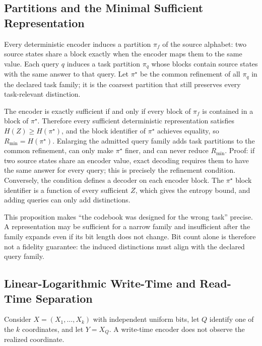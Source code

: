 \subsection{Partitions and the Minimal Sufficient Representation}

Every deterministic encoder induces a partition $\pi_f$ of the source alphabet: two source states share a block exactly when the encoder maps them to the same value. Each query $q$ induces a task partition $\pi_q$ whose blocks contain source states with the same answer to that query. Let $\pi^\star$ be the common refinement of all $\pi_q$ in the declared task family; it is the coarsest partition that still preserves every task-relevant distinction.

\begin{proposition}
The encoder is exactly sufficient if and only if every block of $\pi_f$ is contained in a block of $\pi^\star$. Therefore every sufficient deterministic representation satisfies $H(Z)\geq H(\pi^\star)$, and the block identifier of $\pi^\star$ achieves equality, so $R_{\min}=H(\pi^\star)$. Enlarging the admitted query family adds task partitions to the common refinement, can only make $\pi^\star$ finer, and can never reduce $R_{\min}$. Proof: if two source states share an encoder value, exact decoding requires them to have the same answer for every query; this is precisely the refinement condition. Conversely, the condition defines a decoder on each encoder block. The $\pi^\star$ block identifier is a function of every sufficient $Z$, which gives the entropy bound, and adding queries can only add distinctions.
\end{proposition}

This proposition makes ``the codebook was designed for the wrong task'' precise. A representation may be sufficient for a narrow family and insufficient after the family expands even if its bit length does not change. Bit count alone is therefore not a fidelity guarantee: the induced distinctions must align with the declared query family.

\subsection{Linear-Logarithmic Write-Time and Read-Time Separation}

Consider $X=(X_1,\ldots,X_k)$ with independent uniform bits, let $Q$ identify one of the $k$ coordinates, and let $Y=X_Q$. A write-time encoder does not observe the realized coordinate.

